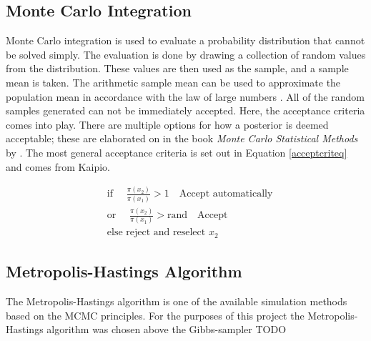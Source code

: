 	
	
		
	\subsection{Monte Carlo Integration}\label{MCint_sec}
	Monte Carlo integration is used to evaluate a probability distribution that cannot be solved simply. 
	The evaluation is done by drawing a collection of random values from the distribution.
	These values are then used as the sample, and a sample mean is taken.
	The arithmetic sample mean can be used to approximate the population mean in accordance with the law of large numbers \citep{Gilks:1996}.
	All of the random samples generated can not be immediately accepted.
	Here, the acceptance criteria comes into play.
	There are multiple options for how a posterior is deemed acceptable; these are elaborated on in the book  \textit{Monte Carlo Statistical Methods} by \citeauthor{Robert:2004}. 
	The most general acceptance criteria is set out in Equation \ref{acceptcriteq} and comes from Kaipio.
	
		\begin{equation} \label{acceptcriteq}
		\begin{aligned}
		&\text{if  }\quad \frac{\pi (x_2)}{\pi(x_1)} > 1 \quad \text{Accept automatically}\\
		&\text{or  }\quad \frac{\pi (x_2)}{\pi(x_1)} > \text{rand}  \quad \text{Accept}\\
		&\text{else reject and reselect  } x_2
		\end{aligned}
		\end{equation}
	

\subsection{Metropolis-Hastings Algorithm}

The Metropolis-Hastings algorithm is one of the available simulation methods based on the MCMC principles. 
For the purposes of this project the Metropolis-Hastings algorithm was chosen above the Gibbs-sampler TODO


